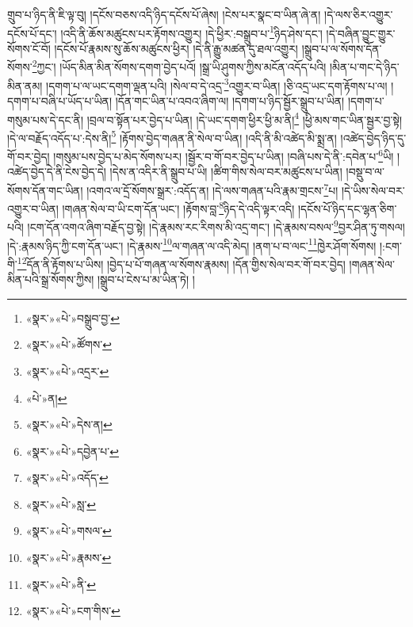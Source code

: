 གྲུབ་པ་ཉིད་ནི་ཇི་ལྟ་བུ། །དངོས་བཅས་འདི་ཉིད་དངོས་པོ་ཞེས། །ངེས་པར་སྣང་བ་ཡིན་ཞེ་ན། །དེ་ལས་ཅིར་འགྱུར་དངོས་པོ་དང་། །འདི་ནི་ཆོས་མཚུངས་པར་རྟོགས་འགྱུར། །དེ་ཕྱིར་:བསྒྲུབ་པ་\footnote{«སྣར་»«པེ་»བསྒྲུབ་བྱ་}ཉིད་ཤེས་དང་། །དེ་བཞིན་བྱུང་གྱུར་སོགས་ངོ་བོ། །དངོས་པོ་རྣམས་སུ་ཆོས་མཚུངས་ཕྱིར། །དེ་ནི་རྒྱུ་མཚན་དུ་ཐལ་འགྱུར། །སྒྲུབ་པ་ལ་སོགས་དོན་སོགས་\footnote{«སྣར་»«པེ་»ཚོགས་}ཀྱང་། །ཡོད་མིན་མིན་སོགས་དགག་བྱེད་པའོ། །སྒྲ་ཡི་ཤུགས་ཀྱིས་མངོན་འདོད་པའི། །མིན་པ་གང་དེ་ཉིད་མིན་ནམ། །དགག་པ་ལ་ཡང་དགག་ལྡན་པའི། །སེལ་བ་དེ་འདྲ་\footnote{«སྣར་»«པེ་»འདྲར་}འགྱུར་བ་ཡིན། །ཅི་འདྲ་ཡང་དག་རྟོགས་པ་ལ། །དགག་པ་བཞི་པ་ཡོད་པ་ཡིན། །དོན་གང་ཡིན་པ་འབའ་ཞིག་ལ། །དགག་པ་ཉིད་སྦྱོར་སྒྲུབ་པ་ཡིན། །དགག་པ་གསུམ་པས་དེ་དང་ནི། །བྲལ་བ་སྟོན་པར་བྱེད་པ་ཡིན། །དེ་ཡང་དགག་ཕྱིར་ཕྱི་མ་ནི།\footnote{«པེ་»ན།} །ཕྱི་མས་གང་ཡིན་སྦྱར་བྱ་སྟེ། །དེ་ལ་བརྗོད་འདོད་པ་:དེས་ནི།\footnote{«སྣར་»«པེ་»དེས་ན།} །རྟོགས་བྱེད་གཞན་ནི་སེལ་བ་ཡིན། །འདི་ནི་མི་འཚེད་མི་སྨྲ་ན། །འཚེད་བྱེད་ཉིད་དུ་གོ་བར་བྱེད། །གསུམ་པས་བྱེད་པ་མེད་སོགས་པར། །སྦྱོར་བ་གོ་བར་བྱེད་པ་ཡིན། །བཞི་པས་དེ་ནི་:དབེན་པ་\footnote{«སྣར་»«པེ་»དབྱེན་པ་}ཡི། །འཚེད་བྱེད་དེ་ནི་ངེས་བྱེད་དེ། །དེས་ན་འདིར་ནི་སྒྲུབ་པ་ཡི། །ཚིག་གིས་སེལ་བར་མཚུངས་པ་ཡིན། །བསྡུ་བ་ལ་སོགས་དོན་གང་ཡིན། །འགའ་ལ་དྲོ་སོགས་སྒྲར་:འདོད་ན། །དེ་ལས་གཞན་པའི་རྣམ་གྲངས་\footnote{«སྣར་»«པེ་»འདོད་}པ། །དེ་ཡིས་སེལ་བར་འགྱུར་བ་ཡིན། །གཞན་སེལ་བ་ཡི་ངག་དོན་ཡང་། །རྟོགས་བླ་\footnote{«སྣར་»«པེ་»སླ་}ཉིད་དེ་འདི་ལྟར་འདི། །དངོས་པོ་ཉིད་དང་ལྷན་ཅིག་པའི། །ངག་དོན་འགའ་ཞིག་བརྗོད་བྱ་སྟེ། །དེ་རྣམས་རང་རིགས་མི་འདྲ་གང་། །དེ་རྣམས་བསལ་\footnote{«སྣར་»«པེ་»གསལ་}བྱར་ཤིན་ཏུ་གསལ། །དེ་:རྣམས་ཉིད་ཀྱི་ངག་དོན་ཡང་། །དེ་རྣམས་\footnote{«སྣར་»«པེ་»རྣམས་}ལ་གཞན་ལ་འདི་མེད། །ནག་པ་བ་ལང་\footnote{«སྣར་»«པེ་»ནི་}ཁྱེར་ཤོག་སོགས། །:ངག་གི་\footnote{«སྣར་»«པེ་»ངག་གིས་}དོན་ནི་རྟོགས་པ་ཡིས། །བྱེད་པ་པོ་གཞན་ལ་སོགས་རྣམས། །དོན་གྱིས་སེལ་བར་གོ་བར་བྱེད། །གཞན་སེལ་མིན་པའི་སྒྲ་སོགས་ཀྱིས། །སྒྲུབ་པ་ངེས་པ་མ་ཡིན་ཏེ། །
